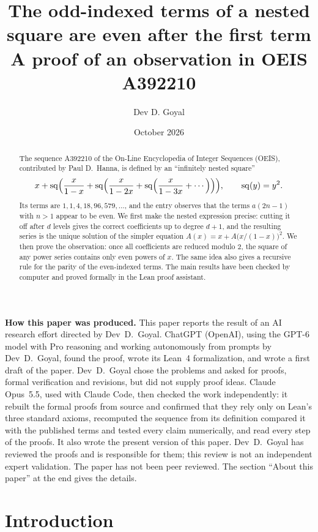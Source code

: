 \documentclass[11pt,a4paper]{article}
\title{The odd-indexed terms of a nested square are even after the first term\\[6pt]\large A proof of an observation in OEIS A392210}
\author{Dev D. Goyal}
\date{October 2026}
\theoremstyle{definition}
\theoremstyle{remark}
\begin{document}
\maketitle
\begin{abstract}
The sequence A392210 of the On-Line Encyclopedia of Integer Sequences (OEIS), contributed by Paul D.~Hanna, is defined
by an ``infinitely nested square''
\[
x+\mathrm{sq}\Bigl(\frac{x}{1-x}+\mathrm{sq}\Bigl(\frac{x}{1-2x}+\mathrm{sq}\Bigl(\frac{x}{1-3x}+\cdots\Bigr)\Bigr)\Bigr),
\qquad \mathrm{sq}(y)=y^2 .
\]
Its terms are $1,1,4,18,96,579,\dots$, and the entry observes that the terms $a(2n-1)$ with $n>1$ appear to be even.
We first make the nested expression precise: cutting it off after $d$ levels gives the correct coefficients up to
degree $d+1$, and the resulting series is the unique solution of the simpler equation $A(x)=x+A\bigl(x/(1-x)\bigr)^2$.
We then prove the observation: once all coefficients are reduced modulo $2$, the square of any power
series contains only even powers of $x$. The same idea also gives a recursive rule for the parity of the even-indexed
terms. The main results have been checked by computer and proved formally in the Lean proof assistant.
\end{abstract}
\begin{center}\begin{minipage}{0.88\linewidth}\small
\textbf{How this paper was produced.} This paper reports the result of an AI research effort directed by
Dev~D.~Goyal. ChatGPT (OpenAI), using the GPT-6 model with Pro reasoning and working autonomously from prompts by
Dev~D.~Goyal, found the proof, wrote its Lean~4 formalization, and wrote a first draft of the paper.
Dev~D.~Goyal chose the problems and asked for proofs, formal verification and revisions, but did not supply proof
ideas. Claude Opus~5.5, used with Claude Code, then checked the work independently: it rebuilt the formal proofs from
source and confirmed that they rely only on Lean's three standard axioms, recomputed the sequence from its definition
compared it with the published terms and tested every claim numerically, and read every step of the proofs. It also wrote the present
version of this paper.
Dev~D.~Goyal has reviewed the proofs and is responsible for them; this review is not an independent expert validation.
The paper has not been peer reviewed.
The section ``About this paper'' at the end gives the details.
\end{minipage}\end{center}

\section{Introduction}
\end{document}
